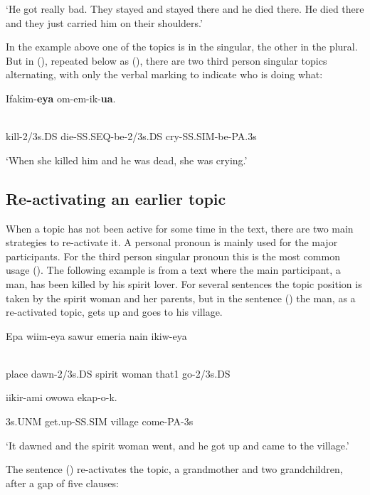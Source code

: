 `He got really bad. They stayed and stayed there and he died there. He died there and they just carried him on their shoulders.'

In the example above one of the topics is in the singular, the other in the plural. But in (), repeated below as (), there are two third person singular topics alternating, with only the verbal marking to indicate who is doing what:

\ea%
\label{ex:x1920}
\gll Ifakim-\textbf{eya}   om-em-ik-\textbf{ua}. \\
      \\
\glt
\z

kill-2/3s.DS  die-SS.SEQ-be-2/3s.DS  cry-SS.SIM-be-PA.3s

`When she killed him and he was dead, she was crying.'

\subsection{Re-activating an earlier topic}
\hypertarget{RefHeading23861935131865}{}
When a topic has not been active for some time in the text, there are two main strategies to re-activate it. A personal pronoun is mainly used for the major participants. For the third person singular pronoun this is the most common usage (). The following example is from a text where the main participant, a man, has been killed by his spirit lover. For several sentences the topic position is taken by the spirit woman and her parents, but in the sentence () the man, as a re-activated topic, gets up and goes to his village.

\ea%
\label{ex:x1921}
\gll Epa  wiim-eya  sawur  emeria  nain  ikiw-eya  \\
      \\
\glt
\z

place  dawn-2/3s.DS  spirit  woman  that1  go-2/3s.DS  

  iikir-ami  owowa  ekap-o-k.

3s.UNM  get.up-SS.SIM  village  come-PA-3s

`It dawned and the spirit woman went, and he got up and came to the village.'

The sentence () re-activates the topic, a grandmother and two grandchildren, after a gap of five clauses:

